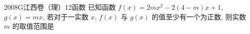 
\begin{problem}{2008}{G}{江西卷（理）}{12}{函数}
已知函数 $ f(x) = 2mx^2 - 2(4-m)x + 1 $, $ g(x) = mx $, 若对于一实数 $ x $, $ f(x) $ 与 $ g(x) $ 的值至少有一个为正数, 则实数 $ m $ 的取值范围是
\begin{choices}
\choice{{$\left( -\infty, 0 \right)$}}
\end{choices}
\end{problem}

\begin{answer}

\end{answer}

\begin{solutions}

\end{solutions}